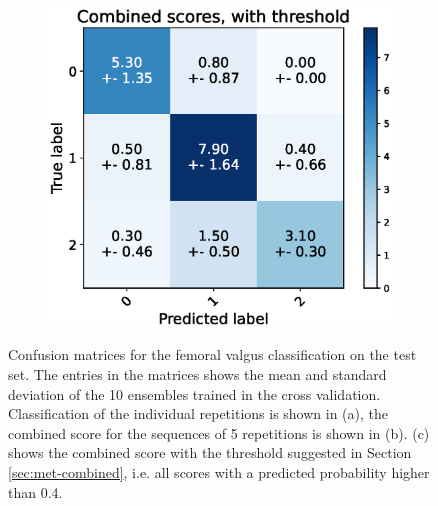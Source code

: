 \begin{figure}
  \begin{subfigure}[t]{0.48\textwidth}
      \includegraphics[width=\textwidth]{files/figs/res/femval/cnf-combined-th.eps}
      \caption{}
      \label{fig:femval-cnf-comb-th}
  \end{subfigure}
  \caption{Confusion matrices for the femoral valgus classification on the test set. The entries in the matrices shows the mean and standard deviation of the 10 ensembles trained in the cross validation. Classification of the individual repetitions is shown in (a), the combined score for the sequences of 5 repetitions is shown in (b). (c) shows the combined score with the threshold suggested in Section \ref{sec:met-combined}, i.e. all scores with a predicted probability higher than 0.4.}
  \label{fig:femval-cnfs}
\end{figure}





